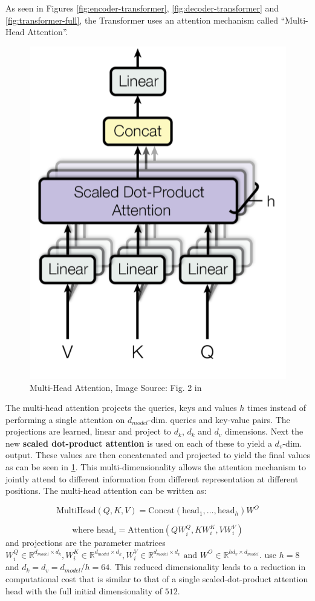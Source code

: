 \documentclass[]{krantz}
\begin{document}
As seen in Figures \ref{fig:encoder-transformer}, \ref{fig:decoder-transformer}
and \ref{fig:transformer-full}, the Transformer uses an attention mechanism called
``Multi-Head Attention''.

\begin{figure}

{\centering \includegraphics[width=0.5\linewidth]{figures/02-02-attention-and-self-attention-for-nlp/multi-head-attention} 

}

\caption{Multi-Head Attention, Image Source: Fig. 2 in \citep{vaswani2017attention}}\label{fig:multi-head-attention}
\end{figure}

The multi-head attention projects the queries, keys and values \(h\) times instead of performing
a single attention on \(d_{model}\)-dim. queries and key-value pairs. The projections
are learned, linear and project to \(d_k\), \(d_k\) and \(d_v\) dimensions. Next the
new \textbf{scaled dot-product attention} is used on each of these to yield a \(d_v\)-dim. output.
These values are then concatenated and projected to yield the final values as can be
seen in \ref{fig:multi-head-attention}. This multi-dimensionality allows the attention
mechanism to jointly attend to different information from different representation
at different positions. The multi-head attention can be written as:

\[
\text{MultiHead}(Q,K,V) = \text{Concat}(\text{head}_1,\dots, \text{head}_h)W^O
\]

\[
\text{where } \text{head}_i = \text{Attention}(QW_i^Q, KW_i^K, VW_i^V)
\]
and projections are the parameter matrices \(W_i^Q\in \mathbb{R}^{d_{model}\times d_k}, W_i^K\in \mathbb{R}^{d_{model}\times d_k}, W_i^V\in \mathbb{R}^{d_{model}\times d_v}\text{ and } W^O\in \mathbb{R}^{hd_{v}\times d_{model}}\).
\citet{vaswani2017attention} use \(h = 8\) and \(d_k = d_v = d_{model}/h = 64\). This reduced dimensionality
leads to a reduction in computational cost that is similar to that of a single scaled-dot-product attention head
with the full initial dimensionality of \(512\).
\end{document}
